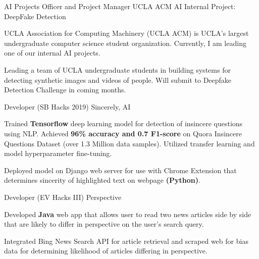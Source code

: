 
\begin{cventries}

    \cventry
    {AI Projects Officer and Project Manager} 
    {UCLA ACM AI Internal Project: DeepFake Detection}
    {}
    {}
    {
      \begin{cvitems} 
        \item UCLA Association for Computing Machinery (UCLA ACM) is UCLA's largest undergraduate computer science 
        student organization. Currently, I am leading one of our internal AI projects.
        \item {Leading a team of UCLA undergraduate students in building systems
        for detecting synthetic images and videos of people. Will submit to Deepfake Detection Challenge in coming months.}
      \end{cvitems}
    }

    \cventry
    {Developer (SB Hacks 2019)} %
    {Sincerely, AI} %
    {} %
    {} %
    {
      \begin{cvitems} %
        \item {Trained \textbf{Tensorflow} deep learning model for detection of insincere questions using 
        NLP. Achieved \textbf{96\% accuracy and 0.7 F1-score} on Quora Insincere 
        Questions Dataset (over 1.3 Million data samples). Utilized transfer learning and model hyperparameter fine-tuning.}
        \item {Deployed model on Django web server for use with Chrome Extension that determines
        sincerity of highlighted text on webpage \textbf{(Python)}.}
      \end{cvitems}
    }

  \cventry
    {Developer (EV Hacks III)} %
    {Perspective} %
    {} %
    {} %
    {
      \begin{cvitems} %
        \item {Developed \textbf{Java} web app that allows user to read two news articles side by side 
        that are likely to differ in perspective on the user's search query. }
        \item{Integrated Bing News Search API for article retrieval and scraped web for bias data for determining likelihood of articles differing in perspective.}
      \end{cvitems}
    }

\end{cventries}
